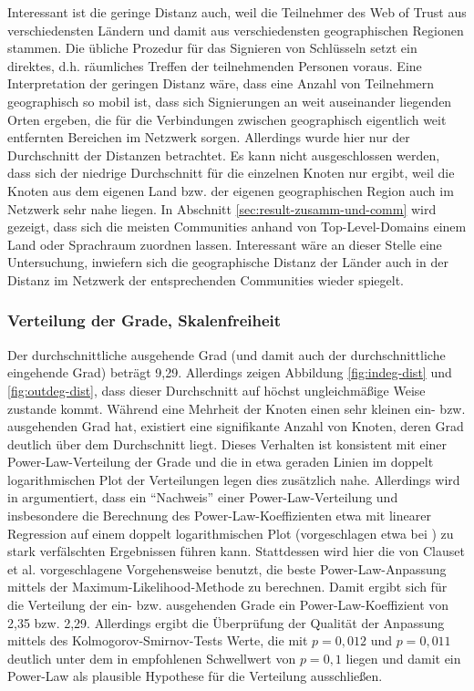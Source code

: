 Interessant ist die geringe Distanz auch, weil die Teilnehmer des Web
of Trust aus verschiedensten Ländern und damit aus verschiedensten
geographischen Regionen stammen. Die übliche Prozedur für das
Signieren von Schlüsseln setzt ein direktes, d.h. räumliches
Treffen der teilnehmenden Personen voraus. Eine Interpretation der
geringen Distanz wäre, dass eine Anzahl von Teilnehmern geographisch
so mobil ist, dass sich Signierungen an weit auseinander liegenden
Orten ergeben, die für die Verbindungen zwischen geographisch
eigentlich weit entfernten Bereichen im Netzwerk sorgen. Allerdings
wurde hier nur der Durchschnitt der Distanzen betrachtet. Es kann
nicht ausgeschlossen werden, dass sich der niedrige Durchschnitt für
die einzelnen Knoten nur ergibt, weil die Knoten aus dem eigenen Land
bzw. der eigenen geographischen Region auch im Netzwerk sehr nahe
liegen. In Abschnitt \ref{sec:result-zusamm-und-comm} wird gezeigt,
dass sich die meisten Communities anhand von Top-Level-Domains einem
Land oder Sprachraum zuordnen lassen. Interessant wäre an dieser
Stelle eine Untersuchung, inwiefern sich die geographische Distanz der
Länder auch in der Distanz im Netzwerk der entsprechenden
Communities wieder spiegelt.

\subsubsection{Verteilung der Grade, Skalenfreiheit}
\label{sec:verteilung-der-grade}

Der durchschnittliche ausgehende Grad (und damit auch der
durchschnittliche eingehende Grad) beträgt 9,29. Allerdings zeigen
Abbildung \ref{fig:indeg-dist} und \ref{fig:outdeg-dist}, dass dieser
Durchschnitt auf höchst ungleichmäßige Weise zustande kommt. Während
eine Mehrheit der Knoten einen sehr kleinen ein- bzw. ausgehenden Grad
hat, existiert eine signifikante Anzahl von Knoten, deren Grad
deutlich über dem Durchschnitt liegt. Dieses Verhalten ist konsistent
mit einer Power-Law-Verteilung der Grade und die in etwa geraden
Linien im doppelt logarithmischen Plot der Verteilungen legen dies
zusätzlich nahe. Allerdings wird in \cite{Clauset2009} argumentiert,
dass ein ``Nachweis'' einer Power-Law-Verteilung und insbesondere die
Berechnung des Power-Law-Koeffizienten etwa mit linearer Regression
auf einem doppelt logarithmischen Plot (vorgeschlagen etwa bei
\cite{Brinkmeier2004}) zu stark verfälschten Ergebnissen führen
kann. Stattdessen wird hier die von Clauset et al. vorgeschlagene
Vorgehensweise benutzt, die beste Power-Law-Anpassung mittels der
Maximum-Likelihood-Methode zu berechnen. Damit ergibt sich für die
Verteilung der ein- bzw. ausgehenden Grade ein Power-Law-Koeffizient
von 2,35 bzw. 2,29. Allerdings ergibt die Überprüfung der Qualität der
Anpassung mittels des Kolmogorov-Smirnov-Tests Werte, die mit $p =
0,012$ und $p = 0,011$ deutlich unter dem in \cite{Clauset2009}
empfohlenen Schwellwert von $p=0,1$ liegen und damit ein Power-Law als
plausible Hypothese für die Verteilung ausschließen.

